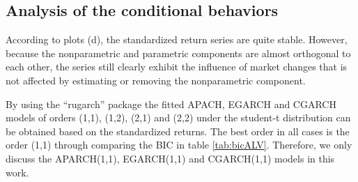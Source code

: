 


\subsection{Analysis of the conditional behaviors}

According to plots (d), the standardized return series are quite stable. However, because the nonparametric and parametric components are almost orthogonal to each other, the series still clearly exhibit the influence of market changes that is not affected by estimating or removing the nonparametric component.

By using the ``rugarch'' package the fitted APACH, EGARCH and CGARCH models of orders (1,1), (1,2), (2,1) and (2,2) under the student-t distribution can be obtained based on the standardized returns. The best order in all cases is the order (1,1) through comparing the BIC in table \ref{tab:bicALV}. Therefore, we only discuss the APARCH(1,1), EGARCH(1,1) and CGARCH(1,1) models in this work.




